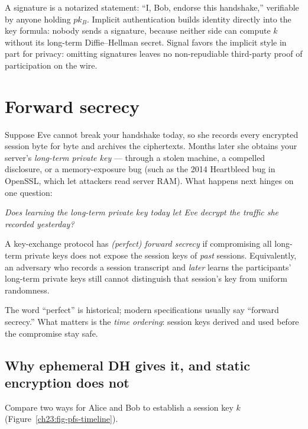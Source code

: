 \begin{intuitionbox}
A signature is a notarized statement: ``I, Bob, endorse this handshake,''
verifiable by anyone holding $pk_B$. Implicit authentication builds identity
directly into the key formula: nobody sends a signature, because neither side
can compute $k$ without its long-term Diffie--Hellman secret. Signal favors the
implicit style in part for privacy: omitting signatures leaves no
non-repudiable third-party proof of participation on the wire.
\end{intuitionbox}

\section{Forward secrecy}

Suppose Eve cannot break your handshake today, so she records every encrypted
session byte for byte and archives the ciphertexts. Months later she obtains
your server's \emph{long-term private key} --- through a stolen machine, a
compelled disclosure, or a memory-exposure bug (such as the 2014 Heartbleed bug
in OpenSSL, which let attackers read server RAM). What happens next hinges on
one question:

\begin{center}
\emph{Does learning the long-term private key today let Eve decrypt the traffic
she recorded yesterday?}
\end{center}

\begin{definition}
\label{ch23:pfs}
A key-exchange protocol has \emph{(perfect) forward secrecy} if compromising all
long-term private keys does not expose the session keys of \emph{past} sessions.
Equivalently, an adversary who records a session transcript and \emph{later}
learns the participants' long-term private keys still cannot distinguish that
session's key from uniform randomness.
\end{definition}

The word ``perfect'' is historical; modern specifications usually say ``forward
secrecy.'' What matters is the \emph{time ordering}: session keys derived and
used before the compromise stay safe.

\subsection{Why ephemeral DH gives it, and static encryption does not}

Compare two ways for Alice and Bob to establish a session key $k$
(Figure~\ref{ch23:fig-pfs-timeline}).

